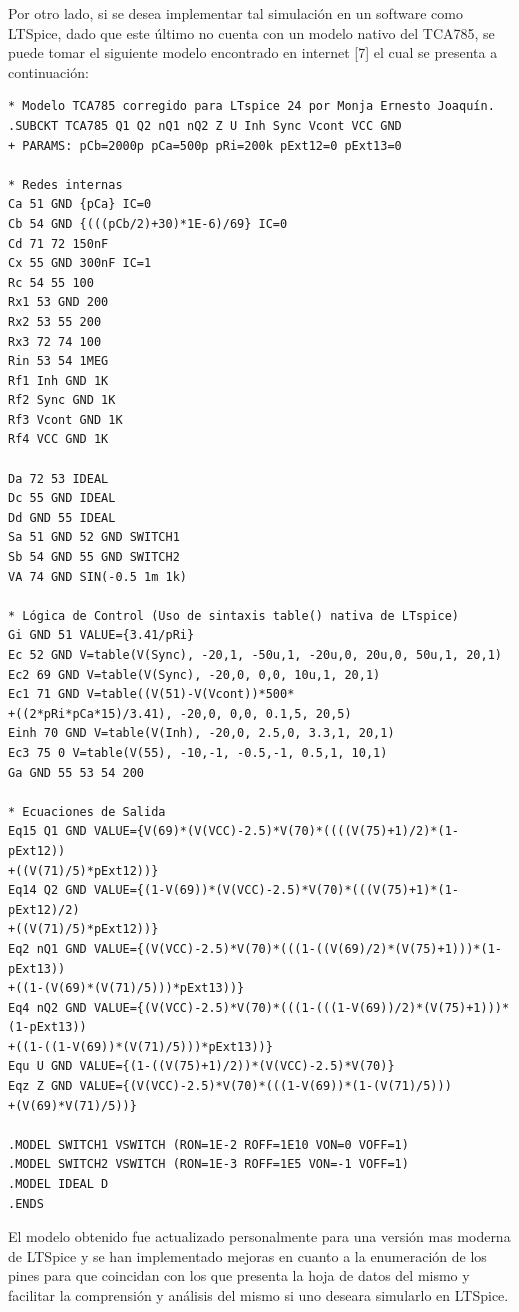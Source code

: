 \documentclass[12pt,a4paper]{article}
\begin{document}
Por otro lado, si se desea implementar tal simulación en un software como LTSpice, dado que este último no cuenta con un modelo nativo del TCA785, se puede tomar el siguiente modelo encontrado en internet [7] el cual se presenta a continuación:
\begin{verbatim}
* Modelo TCA785 corregido para LTspice 24 por Monja Ernesto Joaquín.
.SUBCKT TCA785 Q1 Q2 nQ1 nQ2 Z U Inh Sync Vcont VCC GND
+ PARAMS: pCb=2000p pCa=500p pRi=200k pExt12=0 pExt13=0

* Redes internas
Ca 51 GND {pCa} IC=0
Cb 54 GND {(((pCb/2)+30)*1E-6)/69} IC=0
Cd 71 72 150nF
Cx 55 GND 300nF IC=1
Rc 54 55 100
Rx1 53 GND 200
Rx2 53 55 200
Rx3 72 74 100
Rin 53 54 1MEG
Rf1 Inh GND 1K
Rf2 Sync GND 1K
Rf3 Vcont GND 1K
Rf4 VCC GND 1K

Da 72 53 IDEAL
Dc 55 GND IDEAL
Dd GND 55 IDEAL
Sa 51 GND 52 GND SWITCH1
Sb 54 GND 55 GND SWITCH2
VA 74 GND SIN(-0.5 1m 1k)

* Lógica de Control (Uso de sintaxis table() nativa de LTspice)
Gi GND 51 VALUE={3.41/pRi}
Ec 52 GND V=table(V(Sync), -20,1, -50u,1, -20u,0, 20u,0, 50u,1, 20,1)
Ec2 69 GND V=table(V(Sync), -20,0, 0,0, 10u,1, 20,1)
Ec1 71 GND V=table((V(51)-V(Vcont))*500*
+((2*pRi*pCa*15)/3.41), -20,0, 0,0, 0.1,5, 20,5)
Einh 70 GND V=table(V(Inh), -20,0, 2.5,0, 3.3,1, 20,1)
Ec3 75 0 V=table(V(55), -10,-1, -0.5,-1, 0.5,1, 10,1)
Ga GND 55 53 54 200

* Ecuaciones de Salida
Eq15 Q1 GND VALUE={V(69)*(V(VCC)-2.5)*V(70)*((((V(75)+1)/2)*(1-pExt12))
+((V(71)/5)*pExt12))}
Eq14 Q2 GND VALUE={(1-V(69))*(V(VCC)-2.5)*V(70)*(((V(75)+1)*(1-pExt12)/2)
+((V(71)/5)*pExt12))}
Eq2 nQ1 GND VALUE={(V(VCC)-2.5)*V(70)*(((1-((V(69)/2)*(V(75)+1)))*(1-pExt13))
+((1-(V(69)*(V(71)/5)))*pExt13))}
Eq4 nQ2 GND VALUE={(V(VCC)-2.5)*V(70)*(((1-(((1-V(69))/2)*(V(75)+1)))*(1-pExt13))
+((1-((1-V(69))*(V(71)/5)))*pExt13))}
Equ U GND VALUE={(1-((V(75)+1)/2))*(V(VCC)-2.5)*V(70)}
Eqz Z GND VALUE={(V(VCC)-2.5)*V(70)*(((1-V(69))*(1-(V(71)/5)))
+(V(69)*V(71)/5))}

.MODEL SWITCH1 VSWITCH (RON=1E-2 ROFF=1E10 VON=0 VOFF=1)
.MODEL SWITCH2 VSWITCH (RON=1E-3 ROFF=1E5 VON=-1 VOFF=1)
.MODEL IDEAL D
.ENDS
\end{verbatim}

El modelo obtenido fue actualizado personalmente para una versión mas moderna de LTSpice y se han implementado mejoras en cuanto a la enumeración de los pines para que coincidan con los que presenta la hoja de datos del mismo y facilitar la comprensión y análisis del mismo si uno deseara simularlo en LTSpice.
\end{document}

